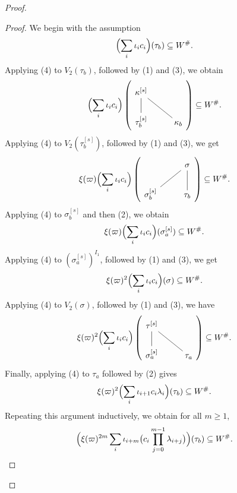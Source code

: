 \documentclass[a4paper,10pt,twoside]{amsart}
\theoremstyle{definition}
\numberwithin{equation}{section}
\begin{document}
\begin{proof}
\begin{proof}
\medskip
We begin with the assumption
\[
\Bigl( \sum_i \iota_i c_i \Bigr)(\tau_b) \subseteq W^\#.
\]
Applying (4) to $V_2(\tau_b)$, followed by (1) and (3), we obtain
\[
\Bigl( \sum_i \iota_i c_i \Bigr)
\left(
\begin{tikzcd}
\kappa^{[s]} & \\
\tau_b^{[s]} & \kappa_b
\arrow[no head, from=1-1, to=2-1]
\arrow[no head, from=1-1, to=2-2]
\end{tikzcd}
\right)
\subseteq W^\#.
\]
Applying (4) to $V_2(\tau_b^{[s]})$, followed by (1) and (3), we get
\[
\xi(\varpi) \Bigl( \sum_i \iota_i c_i \Bigr)
\left(
\begin{tikzcd}
& \sigma \\
\sigma_b^{[s]} & \tau_b
\arrow[no head, from=1-2, to=2-1]
\arrow[no head, from=1-2, to=2-2]
\end{tikzcd}
\right)
\subseteq W^\#.
\]
Applying (4) to $\sigma_b^{[s]}$ and then (2), we obtain
\[
\xi(\varpi) \Bigl( \sum_i \iota_i c_i \Bigr)(\sigma_a^{[s]}) \subseteq W^\#.
\]
Applying (4) to $(\sigma_a^{[s]})^{I_1}$, followed by (1) and (3), we get
\[
\xi(\varpi)^2 \Bigl( \sum_i \iota_i c_i \Bigr)(\sigma) \subseteq W^\#.
\]
Applying (4) to $V_2(\sigma)$, followed by (1) and (3), we have
\[
\xi(\varpi)^2 \Bigl( \sum_i \iota_i c_i \Bigr)
\left(
\begin{tikzcd}
\tau^{[s]} & \\
\sigma_a^{[s]} & \tau_a
\arrow[no head, from=1-1, to=2-1]
\arrow[no head, from=1-1, to=2-2]
\end{tikzcd}
\right)
\subseteq W^\#.
\]
Finally, applying (4) to $\tau_a$ followed by (2) gives
\[
\xi(\varpi)^2 \Bigl( \sum_i \iota_{i+1} c_i \lambda_i \Bigr)(\tau_b) \subseteq W^\#.
\]
Repeating this argument inductively, we obtain for all $m \ge 1$,
\[
\Bigl( \xi(\varpi)^{2m} \sum_i \iota_{i+m} \bigl(c_i \prod_{j=0}^{m-1} \lambda_{i+j} \bigr) \Bigr)(\tau_b) \subseteq W^\#.
\]


\end{proof}
\end{proof}
\end{document}
